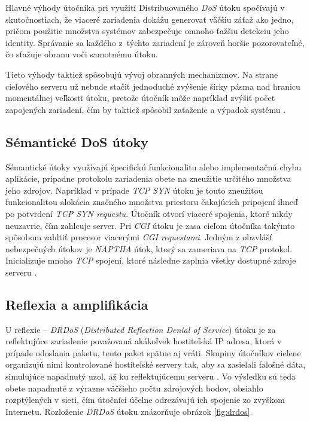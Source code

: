 \documentclass[
  printed, %
  table,   %
  lof,     %
  nolot,   %
  nocover
]{fithesis3}
\begin{document}
Hlavné výhody útočníka pri využití Distribuovaného \textit{DoS} útoku
spočívajú v skutočnostiach, že viaceré zariadenia dokážu generovať väčšiu záťaž ako jedno,
pričom použitie množstva systémov zabezpečuje omnoho ťažšiu detekciu jeho identity. Správanie
sa každého z~týchto zariadení je zároveň horšie pozorovateľné, čo sťažuje obranu voči samotnému útoku.

Tieto výhody taktiež spôsobujú vývoj obranných mechanizmov. Na strane cieľového serveru už
nebude stačiť jednoduché zvýšenie šírky pásma nad hranicu momentálnej veľkosti útoku, pretože
útočník môže napríklad zvýšiť počet zapojených zariadení, čím by taktiež spôsobil zaťaženie a
výpadok systému \cite{Zargar:2013:DDoS}.

\subsection{Sémantické DoS útoky}
Sémantické útoky využívajú špecifickú funkcionalitu alebo implementačnú chybu aplikácie,
prípadne protokolu zariadenia obete na zneužitie určitého množstva jeho zdrojov. Napríklad
v prípade \textit{TCP SYN} útoku je touto zneužitou funkcionalitou alokácia značného množstva
priestoru čakajúcich pripojení ihneď po potvrdení \textit{ TCP SYN requestu}. Útočník otvorí
viaceré spojenia, ktoré nikdy neuzavrie, čím zahlcuje server. 
Pri \textit{CGI} útoku je zasa cieľom útočníka takýmto spôsobom zahltiť procesor viacerými
\textit{CGI requestami}.
Jedným z obzvlášť nebezpečných útokov je \textit{NAPTHA} útok, ktorý sa zameriava na
\textit{TCP} protokol. Inicializuje mnoho \textit{TCP} spojení, ktoré následne zaplnia všetky dostupné zdroje serveru \cite{Mirkovic:2004:DoS}.

\subsection{Reflexia a amplifikácia}
U reflexie -- \textit{DRDoS} (\textit{Distributed Reflection Denial of Service})
útoku je za reflektujúce zariadenie považovaná akákoľvek hostiteľská IP adresa, 
ktorá v prípade odoslania
paketu, tento paket spätne aj vráti.
Skupiny útočníkov cielene organizujú nimi kontrolované hostiteľské servery tak, aby sa zasielali 
falošné dáta, simulujúce napadnutý uzol, až ku reflektujúcemu serveru \cite{Bukac:2015:DoS}. Vo výsledku sú teda obete 
napadnuté z výrazne väčšieho počtu zdrojových bodov, obsiahlo rozptýlených v sieti, čím útočníci účelne 
odrezávajú ich spojenie zo zvyškom Internetu. Rozloženie \textit{DRDoS} útoku znázorňuje obrázok \ref{fig:drdos}.
\end{document}
